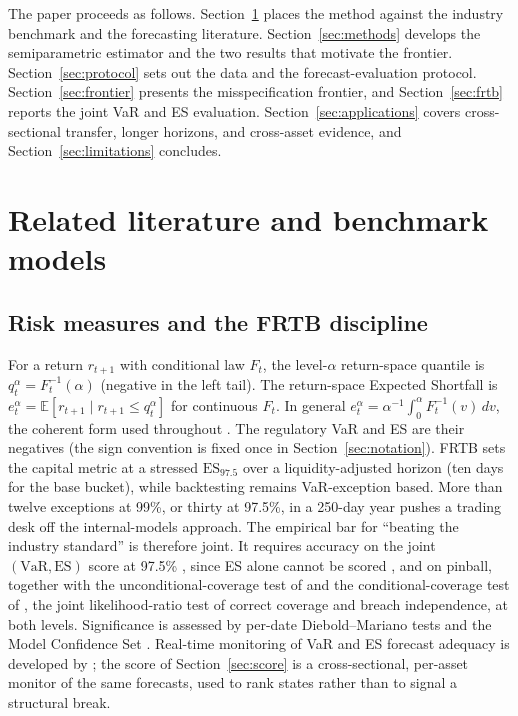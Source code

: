 \documentclass[11pt]{article}
\newcommand{\VaR}{\mathrm{VaR}}
\newcommand{\ES}{\mathrm{ES}}
\theoremstyle{remark}
\begin{document}
\medskip\noindent The paper proceeds as follows.
Section~\ref{sec:background} places the method against the industry benchmark and the forecasting literature. Section~\ref{sec:methods} develops the semiparametric estimator and the two results that motivate the frontier. Section~\ref{sec:protocol} sets out the data and the forecast-evaluation protocol. Section~\ref{sec:frontier} presents the misspecification frontier, and Section~\ref{sec:frtb} reports the joint VaR and ES evaluation. Section~\ref{sec:applications} covers cross-sectional transfer, longer horizons, and cross-asset evidence, and Section~\ref{sec:limitations} concludes.

\section{Related literature and benchmark models}\label{sec:background}

\subsection{Risk measures and the FRTB discipline}

For a return $r_{t+1}$ with conditional law $F_t$, the level-$\alpha$
return-space quantile is $q_t^\alpha = F_t^{-1}(\alpha)$ (negative in
the left tail). The return-space Expected Shortfall is
$e_t^\alpha = \mathbb{E}[r_{t+1} \mid r_{t+1} \le q_t^\alpha]$ for continuous
$F_t$. In general $e_t^\alpha=\alpha^{-1}\!\int_0^\alpha F_t^{-1}(v)\,dv$, the
coherent form used throughout \citep{artzner1999, acerbitasche2002}.
The regulatory VaR and ES are their negatives (the sign convention is
fixed once in Section~\ref{sec:notation}). FRTB \citep{bcbs2019frtb} sets the capital metric at a stressed $\ES_{97.5}$ over a liquidity-adjusted horizon (ten days for the base bucket), while backtesting remains VaR-exception based. More than twelve exceptions at 99\%, or thirty at 97.5\%, in a 250-day year pushes a trading desk off the internal-models approach. The empirical bar for ``beating the industry standard'' is therefore joint. It requires accuracy on the joint $(\VaR,\ES)$ score at 97.5\% \citep{fissler2016, patton2019}, since ES alone cannot be scored \citep{gneiting2011}, and on pinball, together with the unconditional-coverage test of \citet{kupiec1995} and the conditional-coverage test of \citet{christoffersen1998}, the joint likelihood-ratio test of correct coverage and breach independence, at both levels. Significance is assessed by per-date Diebold--Mariano tests \citep{dieboldmariano1995} and the Model Confidence Set \citep{hansen2011mcs}. Real-time monitoring of VaR and ES forecast adequacy is developed by \citet{hoga2023monitoring}; the score of Section~\ref{sec:score} is a cross-sectional, per-asset monitor of the same forecasts, used to rank states rather than to signal a structural break.
\end{document}
